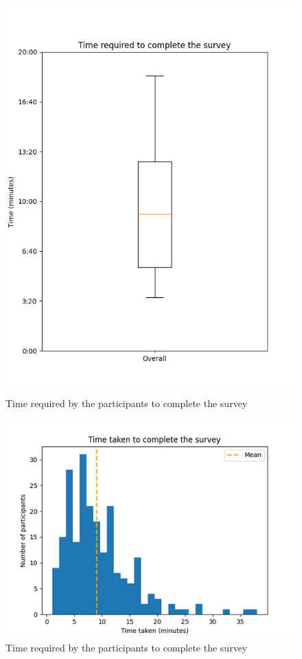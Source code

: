 \documentclass[%
class=scrreprt,
chapterprefix=false,%
open=right,%
twoside=false,%
paper=a4,%
logofile={Logo\_zentral\_farbig\_EN.png},%
thesistype=master,%
UKenglish,%
]{se2thesis}
\begin{document}
	\begin{figure}[t]
		\centering
		\includegraphics[width=\textwidth]{img/survey_time_box.png}
		\caption{Time required by the participants to complete the survey}
		\label{fig:survey_time_box}
	\end{figure}
	
	\begin{figure}[t]
		\centering
		\includegraphics[width=\textwidth]{img/survey_time_histogramm.png}
		\caption{Time required by the participants to complete the survey}
		\label{fig:survey_time_histogramm}
	\end{figure}
	
\end{document}
